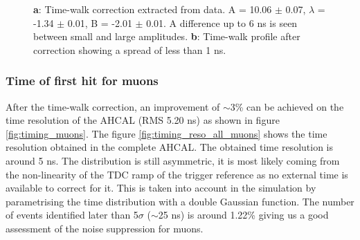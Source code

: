 \documentclass[twoside,a4paper,11pt]{article}
\begin{document}
\begin{figure}[htbp]
	\hfill
	\caption[]{\textbf{a}: Time-walk correction extracted from data. A = 10.06 $\pm$ 0.07, $\lambda$ = -1.34 $\pm$ 0.01, B = -2.01 $\pm$ 0.01. A difference up to 6 ns is seen between small and large amplitudes. \textbf{b}: Time-walk profile after correction showing a spread of less than 1 ns.}
\end{figure}

\subsubsection{Time of first hit for muons}
\label{subsec:Muon_final}

After the time-walk correction, an improvement of $\sim$3\% can be achieved on the time resolution of the AHCAL (RMS 5.20 ns) as shown in figure \ref{fig:timing_muons}. The figure \ref{fig:timing_reso_all_muons} shows the time resolution obtained in the complete AHCAL. The obtained time resolution is around 5 ns. The distribution is still asymmetric, it is most likely coming from the non-linearity of the TDC ramp of the trigger reference as no external time is available to correct for it. This is taken into account in the simulation by parametrising the time distribution with a double Gaussian function. The number of events identified later than 5$\sigma$ ($\sim$25 ns) is around 1.22\% giving us a good assessment of the noise suppression for muons.
\end{document}
